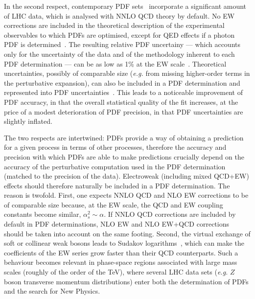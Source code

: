 In the second respect, contemporary PDF
sets~\cite{Harland-Lang:2014zoa,Ball:2017nwa,Hou:2019efy}
incorporate a significant amount of LHC data, which is analysed with NNLO QCD 
theory by default. No EW corrections are included in the theoretical 
description of the experimental observables to which PDFs are optimised,
except for QED effects if a photon PDF is 
determined~\cite{Schmidt:2015zda,Bertone:2017bme,Harland-Lang:2019pla}. 
The resulting relative PDF uncertainy --- 
which accounts only for the uncertainty of the data and of the 
methodology inherent to each PDF determination --- can be as low as 1\% at the 
EW scale~\cite{Ball:2017nwa}. Theoretical uncertainties, possibly of comparable 
size ({\it e.g.} from missing higher-order terms in the perturbative expansion),
can also be included in a PDF determination and represented into PDF 
uncertainties~\cite{AbdulKhalek:2019bux,AbdulKhalek:2019ihb}.
This leads to a noticeable improvement of PDF accuracy, in that the overall 
statistical quality of the fit increases, at the price of a modest 
deterioration of PDF precision, in that PDF uncertainties are slightly inflated.

The two respects are intertwined: PDFs provide a way of obtaining a prediction
for a given process in terms of other processes, therefore the accuracy and 
precision with which PDFs are able to make predictions crucially depend on 
the accuracy of the perturbative computation used in the PDF determination
(matched to the precision of the data). Electroweak (including mixed QCD+EW) 
effects should therefore naturally be included in a PDF determination. The 
reason is twofold. First, one expects NNLO QCD and NLO EW corrections to be of 
comparable size because, at the EW scale, the QCD and EW coupling constants 
become similar, $\alpha_s^2\sim \alpha$. If NNLO QCD corrections are included 
by default in PDF determinations, NLO EW and NLO EW+QCD corrections should be 
taken into account on the same footing. Second, the virtual exchange of soft or 
collinear weak bosons leads to Sudakov 
logarithms~\cite{Denner:2000jv,Denner:2001gw},
which can make the coefficients of the EW series grow faster than 
their QCD counterparts. Such a behaviour becomes relevant in
phase-space regions associated with large mass scales (roughly of the order
of the TeV), where several LHC data sets ({\it e.g.} $Z$ boson transverse 
momentum distributions) enter both the determination of PDFs and the search
for New Physics.

